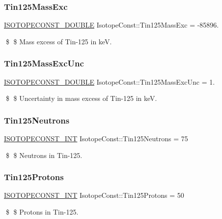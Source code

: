 \subsubsection{\texorpdfstring{Tin125\+Mass\+Exc}{Tin125MassExc}}
{\footnotesize\ttfamily \mbox{\hyperlink{group___isotope_const-_macros_ga8f45a7272ce02c0b4c65c44636ed719a}{I\+S\+O\+T\+O\+P\+E\+C\+O\+N\+S\+T\+\_\+\+D\+O\+U\+B\+LE}} Isotope\+Const\+::\+Tin125\+Mass\+Exc = -\/85896.}

\$ \$ Mass excess of Tin-\/125 in keV. \mbox{\label{group___isotope_const-_tin-_sn125_ga382c84602de16efcb1ab1cb48fb81007}} 
\subsubsection{\texorpdfstring{Tin125\+Mass\+Exc\+Unc}{Tin125MassExcUnc}}
{\footnotesize\ttfamily \mbox{\hyperlink{group___isotope_const-_macros_ga8f45a7272ce02c0b4c65c44636ed719a}{I\+S\+O\+T\+O\+P\+E\+C\+O\+N\+S\+T\+\_\+\+D\+O\+U\+B\+LE}} Isotope\+Const\+::\+Tin125\+Mass\+Exc\+Unc = 1.}

\$ \$ Uncertainty in mass excess of Tin-\/125 in keV. \mbox{\label{group___isotope_const-_tin-_sn125_ga9f7de5ebbc640733e08e1519b0730b9b}} 
\subsubsection{\texorpdfstring{Tin125\+Neutrons}{Tin125Neutrons}}
{\footnotesize\ttfamily \mbox{\hyperlink{group___isotope_const-_macros_ga5f18360b3e99483a35c32d789e62621c}{I\+S\+O\+T\+O\+P\+E\+C\+O\+N\+S\+T\+\_\+\+I\+NT}} Isotope\+Const\+::\+Tin125\+Neutrons = 75}

\$ \$ Neutrons in Tin-\/125. \mbox{\label{group___isotope_const-_tin-_sn125_ga3bb3fec193e597b5c9cfad7520a2cc06}} 
\subsubsection{\texorpdfstring{Tin125\+Protons}{Tin125Protons}}
{\footnotesize\ttfamily \mbox{\hyperlink{group___isotope_const-_macros_ga5f18360b3e99483a35c32d789e62621c}{I\+S\+O\+T\+O\+P\+E\+C\+O\+N\+S\+T\+\_\+\+I\+NT}} Isotope\+Const\+::\+Tin125\+Protons = 50}

\$ \$ Protons in Tin-\/125. 